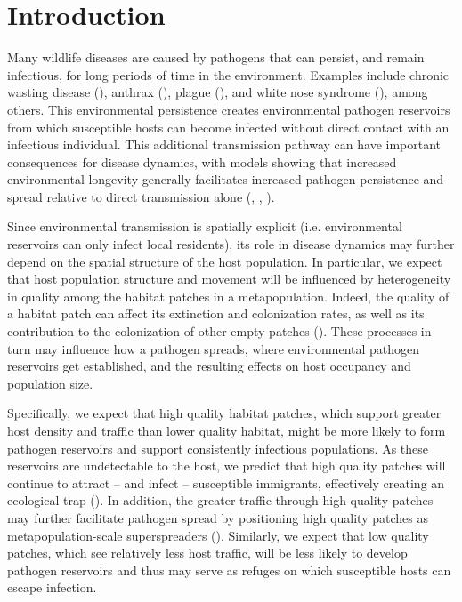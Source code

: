 \documentclass{article}
\begin{document}
\section{Introduction}
\label{intro}

Many wildlife diseases are caused by pathogens that can persist, and remain infectious, for long periods of time in the environment.  Examples include chronic wasting disease (\cite{Miller2006}), anthrax (\cite{Dragon1995}), plague (\cite{Eisen2008}), and white nose syndrome (\cite{Lindner2011}), among others.  This environmental persistence creates environmental pathogen reservoirs from which susceptible hosts can become infected without direct contact with an infectious individual.  This additional transmission pathway can have important consequences for disease dynamics, with models showing that increased environmental longevity generally facilitates increased pathogen persistence and spread relative to direct transmission alone (\cite{Almberg2011}, \cite{Sharp2011}, \cite{Breban2009}). 

Since environmental transmission is spatially explicit (i.e. environmental reservoirs can only infect local residents), its role in disease dynamics may further depend on the spatial structure of the host population.  In particular, we expect that host population structure and movement will be influenced by heterogeneity in quality among the habitat patches in a metapopulation.  Indeed, the quality of a habitat patch can affect its extinction and colonization rates, as well as its contribution to the colonization of other empty patches (\cite{Moilanen1998}).  These processes in turn may influence how a pathogen spreads, where environmental pathogen reservoirs get established, and the resulting effects on host occupancy and population size.  

Specifically, we expect that high quality habitat patches, which support greater host density and traffic than lower quality habitat, might be more likely to form pathogen reservoirs and support consistently infectious populations.  As these reservoirs are undetectable to the host, we predict that high quality patches will continue to attract -- and infect -- susceptible immigrants, effectively creating an ecological trap (\cite{Almberg2011}).  In addition, the greater traffic through high quality patches may further facilitate pathogen spread by positioning high quality patches as metapopulation-scale superspreaders (\cite{Paull2012}).  Similarly, we expect that low quality patches, which see relatively less host traffic, will be less likely to develop pathogen reservoirs and thus may serve as refuges on which susceptible hosts can escape infection.  
\end{document}
